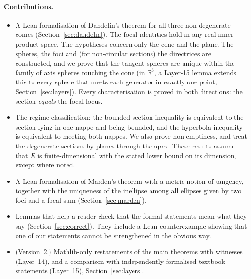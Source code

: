 \documentclass[11pt]{article}
\theoremstyle{remark}
\newcommand{\R}{\mathbb{R}}
\begin{document}
\paragraph{Contributions.}
\begin{itemize}
\item A Lean formalisation of Dandelin's theorem for all three non-degenerate conics
(Section~\ref{sec:dandelin}). The focal identities hold in any real inner product space. The
hypotheses concern only the cone and the plane. The spheres, the foci and (for non-circular
sections) the directrices are constructed, and we prove that the tangent spheres are unique
within the family of axis spheres touching the cone (in $\R^3$, a Layer-15 lemma extends this to
every sphere that meets each generator in exactly one point; Section~\ref{sec:layers}). Every characterisation is proved in both directions: the section
\emph{equals} the focal locus.
\item The regime classification: the bounded-section inequality is equivalent to the section
lying in one nappe and being bounded, and the hyperbola inequality is equivalent to meeting both
nappes. We also prove non-emptiness, and treat the degenerate sections by planes through the apex.
These results assume that $E$ is finite-dimensional with the stated lower bound on its dimension,
except where noted.
\item A Lean formalisation of Marden's theorem with a metric notion of tangency, together with the
uniqueness of the inellipse among all ellipses given by two foci and a focal sum
(Section~\ref{sec:marden}).
\item Lemmas that help a reader check that the formal statements mean what they say
(Section~\ref{sec:correct}). They include a Lean counterexample showing that one of our
statements cannot be strengthened in the obvious way.
\item (Version~2.) Mathlib-only restatements of the main theorems with witnesses (Layer~14), and a
comparison with independently formalised textbook statements (Layer~15), Section~\ref{sec:layers}.
\end{itemize}
\end{document}
